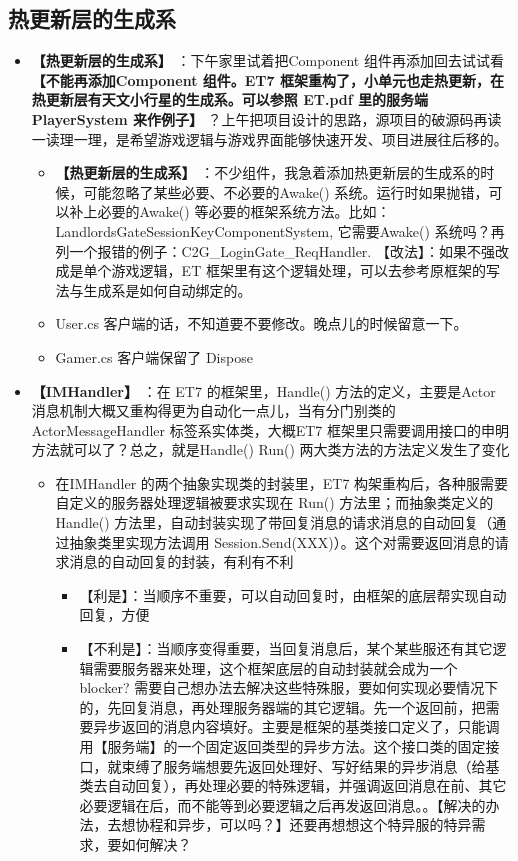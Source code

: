 \documentclass[9pt, b5paper]{article}
\begin{document}
\subsection{热更新层的生成系}
\label{sec:org6c71e39}
\begin{itemize}
\item \textbf{【热更新层的生成系】} ：下午家里试着把Component 组件再添加回去试试看 \textbf{【不能再添加Component 组件。ET7 框架重构了，小单元也走热更新，在热更新层有天文小行星的生成系。可以参照 ET.pdf 里的服务端 PlayerSystem 来作例子】} ？上午把项目设计的思路，源项目的破源码再读一读理一理，是希望游戏逻辑与游戏界面能够快速开发、项目进展往后移的。
\begin{itemize}
\item \textbf{【热更新层的生成系】} ：不少组件，我急着添加热更新层的生成系的时候，可能忽略了某些必要、不必要的Awake() 系统。运行时如果抛错，可以补上必要的Awake() 等必要的框架系统方法。比如：LandlordsGateSessionKeyComponentSystem, 它需要Awake() 系统吗？再列一个报错的例子：C2G\_LoginGate\_ReqHandler. 【改法】：如果不强改成是单个游戏逻辑，ET 框架里有这个逻辑处理，可以去参考原框架的写法与生成系是如何自动绑定的。
\item User.cs 客户端的话，不知道要不要修改。晚点儿的时候留意一下。
\item Gamer.cs 客户端保留了 Dispose
\end{itemize}
\item \textbf{【IMHandler】} ：在 ET7 的框架里，Handle() 方法的定义，主要是Actor 消息机制大概又重构得更为自动化一点儿，当有分门别类的ActorMessageHandler 标签系实体类，大概ET7 框架里只需要调用接口的申明方法就可以了？总之，就是Handle() Run() 两大类方法的方法定义发生了变化
\begin{itemize}
\item 在IMHandler 的两个抽象实现类的封装里，ET7 构架重构后，各种服需要自定义的服务器处理逻辑被要求实现在 Run() 方法里；而抽象类定义的Handle() 方法里，自动封装实现了带回复消息的请求消息的自动回复（通过抽象类里实现方法调用 Session.Send(XXX)）。这个对需要返回消息的请求消息的自动回复的封装，有利有不利
\begin{itemize}
\item 【利是】：当顺序不重要，可以自动回复时，由框架的底层帮实现自动回复，方便
\item 【不利是】：当顺序变得重要，当回复消息后，某个某些服还有其它逻辑需要服务器来处理，这个框架底层的自动封装就会成为一个 blocker? 需要自己想办法去解决这些特殊服，要如何实现必要情况下的，先回复消息，再处理服务器端的其它逻辑。先一个返回前，把需要异步返回的消息内容填好。主要是框架的基类接口定义了，只能调用【服务端】的一个固定返回类型的异步方法。这个接口类的固定接口，就束缚了服务端想要先返回处理好、写好结果的异步消息（给基类去自动回复），再处理必要的特殊逻辑，并强调返回消息在前、其它必要逻辑在后，而不能等到必要逻辑之后再发返回消息。。【解决的办法，去想协程和异步，可以吗？】还要再想想这个特异服的特异需求，要如何解决？

\end{itemize}
\end{itemize}
\end{itemize}
\end{document}
